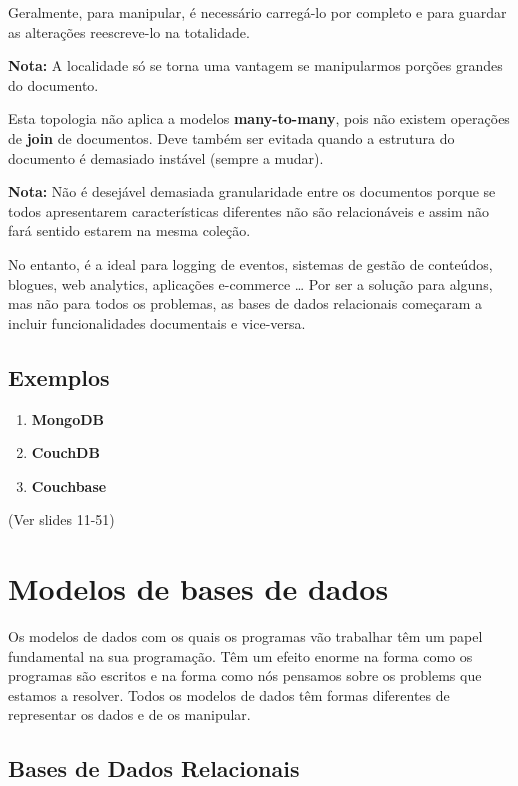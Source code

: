 \documentclass{article}
\begin{document}
Geralmente, para manipular, é necessário carregá-lo por completo e para guardar as
alterações reescreve-lo na totalidade.

\begin{flushleft}
  \textbf{Nota:} A localidade só se torna uma vantagem se manipularmos porções grandes do documento.
\end{flushleft}

\pagebreak

Esta topologia não aplica a modelos \textbf{many-to-many}, pois não existem
operações de \textbf{join} de documentos. Deve também ser evitada quando a estrutura
do documento é demasiado instável (sempre a mudar).

\begin{flushleft}
  \textbf{Nota:} Não é desejável demasiada granularidade entre os documentos porque se todos apresentarem características
  diferentes não são relacionáveis e assim não fará sentido estarem na mesma coleção.
\end{flushleft}

No entanto, é a ideal para logging de eventos, sistemas de gestão de conteúdos,
blogues, web analytics, aplicações e-commerce \dots
Por ser a solução para alguns, mas não para todos os problemas, as bases de dados
relacionais começaram a incluir funcionalidades documentais e vice-versa.

\subsection{Exemplos}
  \begin{enumerate}
    \item \textbf{MongoDB}
    \item \textbf{CouchDB}
    \item \textbf{Couchbase}
  \end{enumerate}
  (Ver slides 11-51)

\section{Modelos de bases de dados}

Os modelos de dados com os quais os programas vão trabalhar têm um papel fundamental na
sua programação.
Têm um efeito enorme na forma como os programas são escritos e na forma como
nós pensamos sobre os problems que estamos a resolver. Todos os modelos de dados
têm formas diferentes de representar os dados e de os manipular.

\subsection{Bases de Dados Relacionais}
\end{document}
